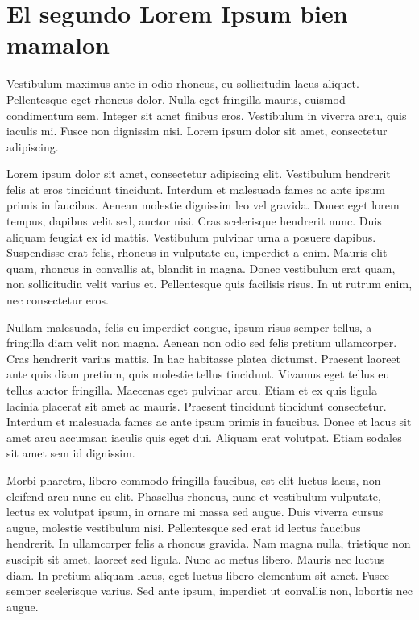 
\section{El segundo Lorem Ipsum bien mamalon}
\label{secLoremIpsumCap2}

Vestibulum maximus ante in odio rhoncus, eu sollicitudin lacus aliquet. Pellentesque eget rhoncus dolor. Nulla eget fringilla mauris, euismod condimentum sem. Integer sit amet finibus eros. Vestibulum in viverra arcu, quis iaculis mi. Fusce non dignissim nisi. Lorem ipsum dolor sit amet, consectetur adipiscing.

Lorem ipsum dolor sit amet, consectetur adipiscing elit. Vestibulum hendrerit felis at eros tincidunt tincidunt. Interdum et malesuada fames ac ante ipsum primis in faucibus. Aenean molestie dignissim leo vel gravida. Donec eget lorem tempus, dapibus velit sed, auctor nisi. Cras scelerisque hendrerit nunc. Duis aliquam feugiat ex id mattis. Vestibulum pulvinar urna a posuere dapibus. Suspendisse erat felis, rhoncus in vulputate eu, imperdiet a enim. Mauris elit quam, rhoncus in convallis at, blandit in magna. Donec vestibulum erat quam, non sollicitudin velit varius et. Pellentesque quis facilisis risus. In ut rutrum enim, nec consectetur eros.

Nullam malesuada, felis eu imperdiet congue, ipsum risus semper tellus, a fringilla diam velit non magna. Aenean non odio sed felis pretium ullamcorper. Cras hendrerit varius mattis. In hac habitasse platea dictumst. Praesent laoreet ante quis diam pretium, quis molestie tellus tincidunt. Vivamus eget tellus eu tellus auctor fringilla. Maecenas eget pulvinar arcu. Etiam et ex quis ligula lacinia placerat sit amet ac mauris. Praesent tincidunt tincidunt consectetur. Interdum et malesuada fames ac ante ipsum primis in faucibus. Donec et lacus sit amet arcu accumsan iaculis quis eget dui. Aliquam erat volutpat. Etiam sodales sit amet sem id dignissim.

Morbi pharetra, libero commodo fringilla faucibus, est elit luctus lacus, non eleifend arcu nunc eu elit. Phasellus rhoncus, nunc et vestibulum vulputate, lectus ex volutpat ipsum, in ornare mi massa sed augue. Duis viverra cursus augue, molestie vestibulum nisi. Pellentesque sed erat id lectus faucibus hendrerit. In ullamcorper felis a rhoncus gravida. Nam magna nulla, tristique non suscipit sit amet, laoreet sed ligula. Nunc ac metus libero. Mauris nec luctus diam. In pretium aliquam lacus, eget luctus libero elementum sit amet. Fusce semper scelerisque varius. Sed ante ipsum, imperdiet ut convallis non, lobortis nec augue.

